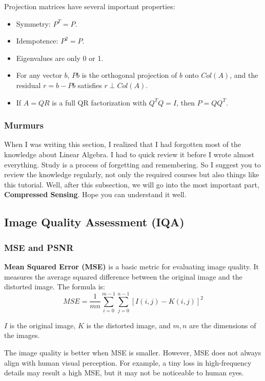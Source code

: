 \documentclass[12pt]{ctexart}
\begin{document}
Projection matrices have several important properties:

\begin{itemize}
  \item Symmetry: $P^T = P$.
  \item Idempotence: $P^2 = P$.
  \item Eigenvalues are only 0 or 1.
  \item For any vector $b$, $Pb$ is the orthogonal projection of $b$ onto $Col(A)$, and the residual $r = b - Pb$ satisfies $r \perp Col(A)$.
  \item If $A = Q R$ is a full QR factorization with $Q^T Q = I$, then $P = Q Q^T$.
\end{itemize}

\subsubsection{\textbf{Murmurs}}

When I was writing this section, I realized that I had forgotten most of the knowledge about
Linear Algebra. I had to quick review it before I wrote almost everything. Study is a
process of forgetting and remembering. So I suggest you to review the knowledge
regularly, not only the required courses but also things like this tutorial. Well, after this
subsection, we will go into the most important part, \textbf{Compressed Sensing}. Hope you
can understand it well.

\subsection{\textbf{Image Quality Assessment (IQA)}}
\subsubsection{\textbf{MSE and PSNR}}

\textbf{Mean Squared Error (MSE)} is a basic metric for evaluating image quality. It
measures the average squared difference between the original image and the distorted
image. The formula is:
\[
  MSE = \frac{1}{mn} \sum_{i=0}^{m-1} \sum_{j=0}^{n-1} [I(i,j) - K(i,j)]^2
\]

$I$ is the original image, $K$ is the distorted image, and $m, n$ are the dimensions of
the images.

The image quality is better when MSE is smaller. However, MSE does not always align with
human visual perception. For example, a tiny loss in high-frequency details may result a
high MSE, but it may not be noticeable to human eyes.
\end{document}
